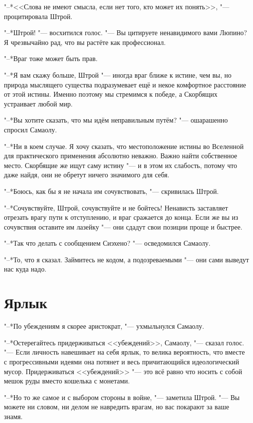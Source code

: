 \documentclass[a4paper,10pt]{book}
\begin{document}
"--*<<Слова не имеют смысла, если нет того, кто может их понять>>, "--- процитировала Штрой.

"--*Штрой! "--- восхитился голос. "--- Вы цитируете ненавидимого вами Люпино? Я чрезвычайно рад, что вы растёте как профессионал. 

"--*Враг тоже может быть прав.

"--*Я вам скажу больше, Штрой "--- иногда враг ближе к истине, чем вы, но природа мыслящего существа подразумевает ещё и некое комфортное расстояние от этой истины. Именно поэтому мы стремимся к победе, а Скорбящих устраивает любой мир.

"--*Вы хотите сказать, что мы идём неправильным путём? "--- ошарашенно спросил Самаолу.

"--*Ни в коем случае. Я хочу сказать, что местоположение истины во Вселенной для практического применения абсолютно неважно. Важно найти собственное место. Скорбящие же ищут саму истину "--- и в этом их слабость, потому что даже найдя, они не обретут ничего значимого для себя.

"--*Боюсь, как бы я не начала им сочувствовать, "--- скривилась Штрой.

"--*Сочувствуйте, Штрой, сочувствуйте и не бойтесь! Ненависть заставляет отрезать врагу пути к отступлению, и враг сражается до конца. Если же вы из сочувствия оставите им лазейку "--- они сдадут свои позиции проще и быстрее.

"--*Так что делать с сообщением Сиэхено? "--- осведомился Самаолу.

"--*То, что я сказал. Займитесь не кодом, а подозреваемыми "--- они сами выведут нас куда надо.

\section{Ярлык}

"--*По убеждениям я скорее аристократ, "--- ухмыльнулся Самаолу.

"--*Остерегайтесь придерживаться <<убеждений>>, Самаолу, "--- сказал голос. "--- Если личность навешивает на себя ярлык, то велика вероятность, что вместе с прогрессивными идеями она потянет и весь причитающийся идеологический мусор. Придерживаться <<убеждений>> "--- это всё равно что носить с собой мешок руды вместо кошелька с монетами.

"--*Но то же самое и с выбором стороны в войне, "--- заметила Штрой. "--- Вы можете ни словом, ни делом не навредить врагам, но вас покарают за ваше знамя.
\end{document}
